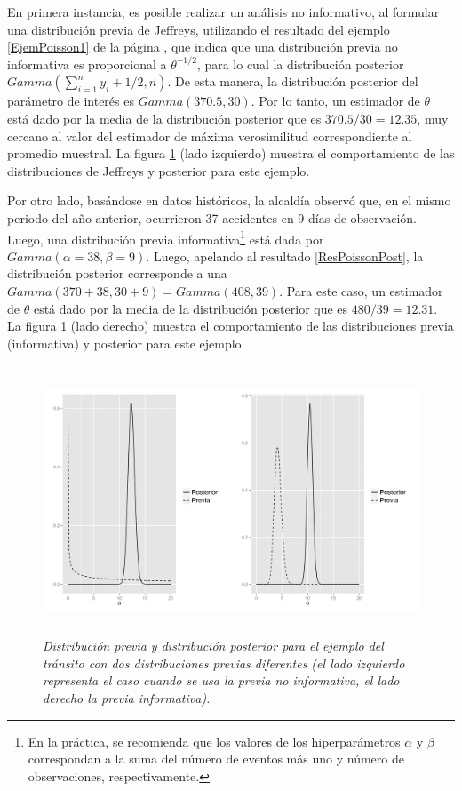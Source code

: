 \begin{Eje}
    En primera instancia, es posible realizar un an\'alisis no informativo, al formular una distribuci\'on previa de Jeffreys, utilizando el resultado del ejemplo \ref{EjemPoisson1} de la p\'agina \pageref{EjemPoisson1}, que indica que una distribuci\'on previa no informativa es proporcional a $\theta^{-1/2}$, para lo cual la distribuci\'on posterior $Gamma(\sum_{i=1}^n y_i+1/2, n)$. De esta manera, la distribuci\'on posterior del par\'ametro de inter\'es es $Gamma(370.5, 30)$. Por lo tanto, un estimador de $\theta$ est\'a dado por la media de la distribuci\'on posterior que es $370.5/30=12.35$, muy cercano al valor del estimador de m\'axima verosimilitud correspondiente al promedio muestral. La figura \ref{EjemPoisson2} (lado izquierdo) muestra el comportamiento de las distribuciones de Jeffreys y posterior para este ejemplo.
    
    Por otro lado, bas\'andose en datos hist\'oricos, la alcald\'ia observ\'o que, en el mismo periodo del a\~no anterior, ocurrieron 37 accidentes en 9 d\'ias de observaci\'on. Luego, una distribuci\'on previa informativa\footnote{En la pr\'actica, se recomienda que los valores de los hiperpar\'ametros $\alpha$ y $\beta$ correspondan a la suma del n\'umero de eventos m\'as uno y n\'umero de observaciones, respectivamente.} est\'a dada por $Gamma(\alpha=38,\beta=9)$. Luego, apelando al resultado \ref{ResPoissonPost}, la distribuci\'on posterior corresponde a una $Gamma(370+38, 30+9)=Gamma(408, 39)$. Para este caso, un estimador de $\theta$ est\'a dado por la media de la distribuci\'on posterior que es $480/39=12.31$. La figura \ref{EjemPoisson2} (lado derecho) muestra el comportamiento de las distribuciones previa (informativa) y posterior para este ejemplo.
    
    \begin{figure}[!h]
    \centering
    \includegraphics[width=18cm,height=8cm]{EjemPoisson2.pdf}
    \caption{\emph{Distribuci\'on previa y distribuci\'on posterior para el ejemplo del tr\'ansito con dos distribuciones previas diferentes (el lado izquierdo representa el caso cuando se usa la previa no informativa, el lado derecho la previa informativa).}}
    \label{EjemPoisson2}
    \end{figure}
    

\end{Eje}
